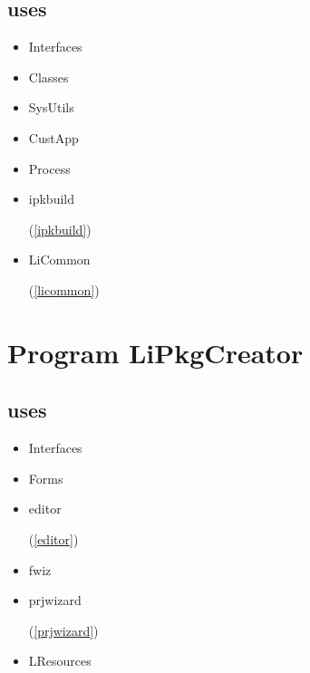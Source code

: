 \documentclass{report}
\begin{document}
\section{uses}
\begin{itemize}
\item \begin{ttfamily}Interfaces\end{ttfamily}\item \begin{ttfamily}Classes\end{ttfamily}\item \begin{ttfamily}SysUtils\end{ttfamily}\item \begin{ttfamily}CustApp\end{ttfamily}\item \begin{ttfamily}Process\end{ttfamily}\item \begin{ttfamily}ipkbuild\end{ttfamily}(\ref{ipkbuild})\item \begin{ttfamily}LiCommon\end{ttfamily}(\ref{licommon})\end{itemize}
\chapter{Program LiPkgCreator}
\label{LiPkgCreator}
\section{uses}
\begin{itemize}
\item \begin{ttfamily}Interfaces\end{ttfamily}\item \begin{ttfamily}Forms\end{ttfamily}\item \begin{ttfamily}editor\end{ttfamily}(\ref{editor})\item \begin{ttfamily}fwiz\end{ttfamily}\item \begin{ttfamily}prjwizard\end{ttfamily}(\ref{prjwizard})\item \begin{ttfamily}LResources\end{ttfamily}\end{itemize}
\end{document}
